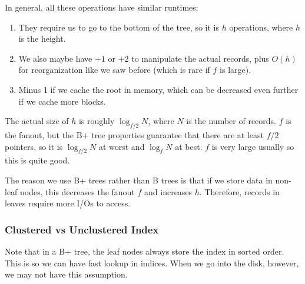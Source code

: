     \begin{theorem}
      In general, all these operations have similar runtimes: 
      \begin{enumerate}
        \item They require us to go to the bottom of the tree, so it is $h$ operations, where $h$ is the height. 
        \item We also maybe have $+1$ or $+2$ to manipulate the actual records, plus $O(h)$ for reorganization like we saw before (which is rare if $f$ is large). 
        \item Minus 1 if we cache the root in memory, which can be decreased even further if we cache more blocks. 
      \end{enumerate}
      
      The actual size of $h$ is roughly $\log_{f/2} {N}$, where $N$ is the number of records. $f$ is the fanout, but the B+ tree properties guarantee that there are at least $f/2$ pointers, so it is $\log_{f/2} N$ at worst and $\log_{f} N$ at best. $f$ is very large usually so this is quite good. 
    \end{theorem}
    
    The reason we use B+ trees rather than B trees is that if we store data in non-leaf nodes, this decreases the fanout $f$ and increases $h$. Therefore, records in leaves require more I/Os to access. 

  \subsubsection{Clustered vs Unclustered Index} 

    Note that in a B+ tree, the leaf nodes always store the index in sorted order. This is so we can have fast lookup in indices. When we go into the disk, however, we may not have this assumption.  

